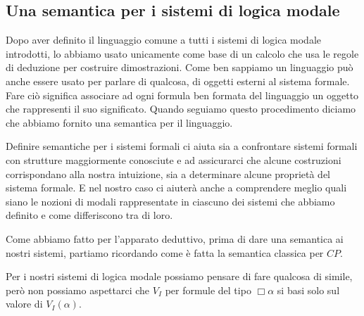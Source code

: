 \documentclass[a4paper, titlepage, 12pt]{report}
\begin{document}
%
%
%
%
%
%
\subsection{Una semantica per i sistemi di logica modale}
Dopo aver definito il linguaggio comune a tutti i sistemi di logica modale introdotti,
lo abbiamo usato unicamente come base di un calcolo che usa le regole di deduzione per costruire
dimostrazioni. Come ben sappiamo un linguaggio può anche essere usato per parlare di qualcosa,
di oggetti esterni al sistema formale.
Fare ciò significa associare ad ogni formula ben formata del linguaggio un oggetto
che rappresenti il suo significato.
Quando seguiamo questo procedimento diciamo che abbiamo fornito una semantica per il linguaggio.

Definire semantiche per i sistemi formali ci aiuta sia a confrontare sistemi formali
con strutture maggiormente conosciute e ad assicurarci
che alcune costruzioni corrispondano alla nostra intuizione,
sia a determinare alcune proprietà del sistema formale. E nel nostro caso ci aiuterà anche
a comprendere meglio quali siano le nozioni di modali rappresentate in ciascuno dei sistemi
che abbiamo definito e come differiscono tra di loro.


Come abbiamo fatto per l'apparato deduttivo, prima di dare una semantica ai nostri sistemi,
partiamo ricordando come è fatta la semantica classica per $CP$.

Per i nostri sistemi di logica modale possiamo pensare di fare qualcosa di simile,
però non possiamo aspettarci che $V_I$ per formule del tipo $\Box \alpha$ si basi solo
sul valore di $V_I(\alpha)$.
\end{document}
